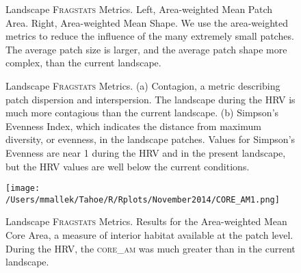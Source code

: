 \clearpage

\begin{figure}[!htbp]
  \centering
\caption{Landscape \textsc{Fragstats} Metrics. Left, Area-weighted Mean Patch Area. Right, Area-weighted Mean Shape. We use the area-weighted metrics to reduce the influence of the many extremely small patches. The average patch size is larger, and the average patch shape more complex, than the current landscape.} 
\label{fig:fragland_areashape}
\end{figure}

\begin{figure}[!htbp]
  \centering
\caption{Landscape \textsc{Fragstats} Metrics. (a) Contagion, a metric describing patch dispersion and interspersion. The landscape during the HRV is much more contagious than the current landscape. (b) Simpson's Evenness Index, which indicates the distance from maximum diversity, or evenness, in the landscape patches. Values for Simpson's Evenness are near 1 during the HRV and in the present landscape, but the HRV values are well below the current conditions.} 
\label{fig:fragland_contagsiei}
\end{figure}

\begin{figure}[!htbp]
  \centering
  \texttt{[image: /Users/mmallek/Tahoe/R/Rplots/November2014/CORE\_AM1.png]}
\caption{Landscape \textsc{Fragstats} Metrics. Results for the Area-weighted Mean Core Area, a measure of interior habitat available at the patch level. During the HRV, the \textsc{core\_am} was much greater than in the current landscape.} 
\label{fig:fragland_core}
\end{figure}



